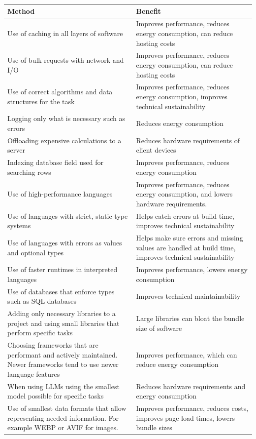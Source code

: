 \begin{longtable}{ |p{}|p{}| }
\hline
\textbf{Method} & \textbf{Benefit}\\
\hline
Use of caching in all layers of software & Improves performance, reduces energy consumption, can reduce hosting costs \\
\hline
Use of bulk requests with network and I/O & Improves performance, reduces energy consumption, can reduce hosting costs \\
\hline
Use of correct algorithms and data structures for the task & Improves performance, reduces energy consumption, improves technical sustainability\\
\hline
Logging only what is necessary such as errors & Reduces energy consumption\\
\hline
Offloading expensive calculations to a server & Reduces hardware requirements of client devices\\
\hline
Indexing database field used for searching rows & Improves performance, reduces energy consumption\\
\hline
Use of high-performance languages & Improves performance, reduces energy consumption, and lowers hardware requirements.\\
\hline
Use of languages with strict, static type systems & Helps catch errors at build time, improves technical sustainability \\
\hline
Use of languages with errors as values and optional types & Helps make sure errors and missing values are handled at build time, improves technical sustainability\\
\hline
Use of faster runtimes in interpreted languages & Improves performance, lowers energy consumption\\
\hline
Use of databases that enforce types such as SQL databases & Improves technical maintainability\\
\hline
Adding only necessary libraries to a project and using small libraries that perform specific tasks & Large libraries can bloat the bundle size of software\\
\hline
Choosing frameworks that are performant and actively maintained. Newer frameworks tend to use newer language features & Improves performance, which can reduce energy consumption\\
\hline
When using LLMs using the smallest model possible for specific tasks & Reduces hardware requirements and energy consumption\\
\hline
Use of smallest data formats that allow representing needed information. For example WEBP or AVIF for images. & Improves performance, reduces costs, improves page load times, lowers bundle sizes\\

\end{longtable}
